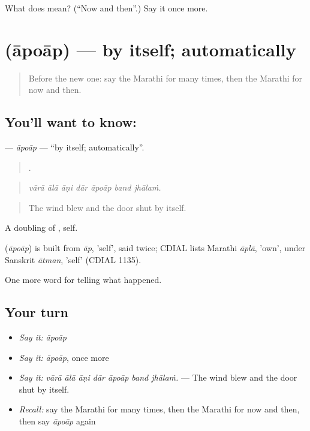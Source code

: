 \begin{tcolorbox}[breakable,colback=teal!4,colframe=teal!35!black,title={Before you move on}]
What does  mean? (\textquotedblleft{}Now and then\textquotedblright{}.) Say it once more.
\end{tcolorbox}
\section[\texorpdfstring{\mr{आपोआप} (āpoāp)}{आपोआप (āpoāp)}]{ (āpoāp) — by itself; automatically}

\label{lesson:MR-C306-apoap}



\begin{quote}
Before the new one: say the Marathi for many times, then the Marathi for now and then.
\end{quote}

\subsection*{You'll want to know: }
\textbf{} — \emph{āpoāp} — \textquotedblleft{}by itself; automatically\textquotedblright{}.

\begin{quote}
      .
\end{quote}

\begin{quote}
\emph{vārā ālā āṇi dār āpoāp band jhālaṁ.}
\end{quote}

\begin{quote}
The wind blew and the door shut by itself.
\end{quote}

A doubling of , self.

\begin{cousinweb}
\textbf{} (\emph{āpoāp}) is built from \emph{āp}, 'self', said twice; CDIAL lists Marathi \emph{āplā}, 'own', under Sanskrit \emph{ātman}, 'self' (CDIAL 1135).
\end{cousinweb}

\begin{grammarlens}[title={What you've built}]
One more word for telling what happened.
\end{grammarlens}

\subsection*{Your turn}
\begin{itemize}
\raggedright
  \item \emph{Say it:} \emph{āpoāp}
  \item \emph{Say it:} \emph{āpoāp}, once more
  \item \emph{Say it:} \emph{vārā ālā āṇi dār āpoāp band jhālaṁ.} — The wind blew and the door shut by itself.
  \item \emph{Recall:} say the Marathi for many times, then the Marathi for now and then, then say \emph{āpoāp} again
\end{itemize}

